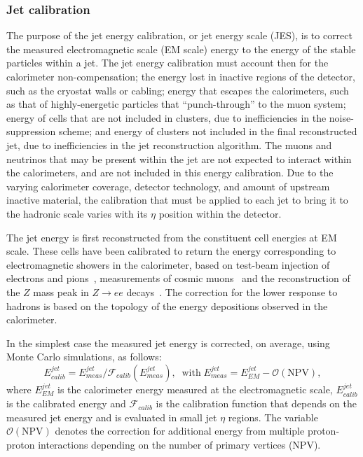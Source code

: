 \subsubsection{Jet calibration}\label{sec:calib}

The purpose of the jet energy calibration, or jet energy scale (JES), is to correct the measured electromagnetic scale (EM scale) energy to the energy of the stable particles within a jet.  The jet energy calibration must account then for the calorimeter non-compensation; the energy lost in inactive regions of the detector, such as the cryostat walls or cabling; energy that escapes the calorimeters, such as that of highly-energetic particles that ``punch-through'' to the muon system; energy of cells that are not included in clusters, due to inefficiencies in the noise-suppression scheme; and energy of clusters not included in the final reconstructed jet, due to inefficiencies in the jet reconstruction algorithm. The muons and neutrinos that may be present within the jet are not expected to interact within the calorimeters, and are not included in this energy calibration.
Due to the varying calorimeter coverage, detector technology, and amount of upstream inactive material, the calibration that must be applied to each jet to bring it to the hadronic scale varies with its $\eta$ position within the detector. 

The jet energy is first reconstructed from the constituent cell energies at EM scale. These cells have been calibrated to return the energy corresponding to electromagnetic showers in the calorimeter, based on test-beam injection of electrons and pions~\cite{Aharrouche2006601},  measurements of cosmic muons~\cite{Cooke:1071187} and the reconstruction of the $Z$ mass peak in $Z \rightarrow ee$ decays~\cite{Aad:2011mk}. The correction for the lower response to hadrons is based on the topology of the energy depositions observed in the calorimeter. 

In the simplest case the measured jet energy is corrected, on average, using Monte Carlo simulations, as follows:
%
\begin{equation}
E^{jet}_{calib} = E^{jet}_{meas} /\mathcal{F}_{calib}(E^{jet}_{meas}),\; \; \mbox{with} \;  E^{jet}_{meas} = E^{jet}_{EM} - \mathcal{O}(\mbox{NPV}),
\end{equation}
%
where $E^{jet}_{EM}$ is the calorimeter energy measured at the electromagnetic scale, $E^{jet}_{calib}$ is the calibrated energy and $\mathcal{F}_{calib}$ is the calibration function that depends on the measured jet energy and is evaluated in small jet $\eta$ regions. The variable $ \mathcal{O}(\mbox{NPV})$ denotes the correction for additional energy from multiple proton-proton interactions depending on the number of primary vertices (NPV).

